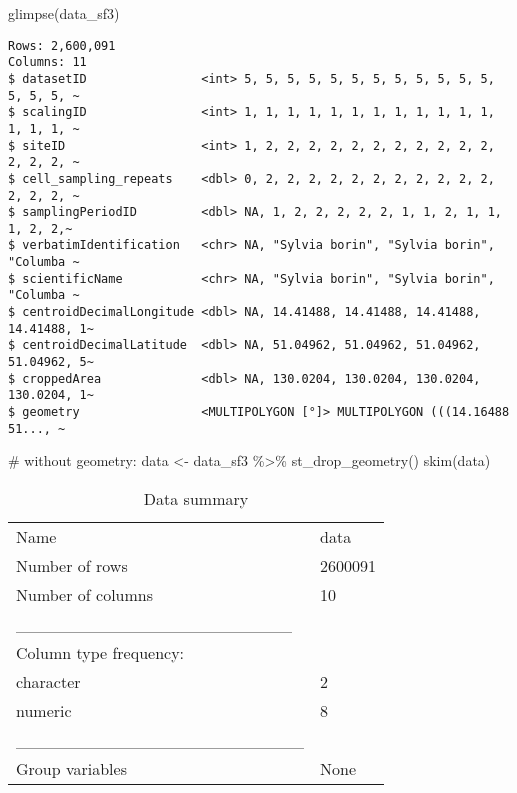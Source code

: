 \documentclass[
  letterpaper,
  DIV=11,
  numbers=noendperiod]{scrreprt}
\newenvironment{Shaded}{\begin{snugshade}}{\end{snugshade}}
\newcommand{\CommentTok}[1]{\textcolor[rgb]{0.37,0.37,0.37}{#1}}
\newcommand{\FunctionTok}[1]{\textcolor[rgb]{0.28,0.35,0.67}{#1}}
\newcommand{\NormalTok}[1]{\textcolor[rgb]{0.00,0.23,0.31}{#1}}
\newcommand{\OtherTok}[1]{\textcolor[rgb]{0.00,0.23,0.31}{#1}}
\newcommand{\SpecialCharTok}[1]{\textcolor[rgb]{0.37,0.37,0.37}{#1}}
\begin{document}
\begin{Shaded}
\begin{Highlighting}[]
\FunctionTok{glimpse}\NormalTok{(data\_sf3)}
\end{Highlighting}
\end{Shaded}

\begin{verbatim}
Rows: 2,600,091
Columns: 11
$ datasetID                <int> 5, 5, 5, 5, 5, 5, 5, 5, 5, 5, 5, 5, 5, 5, 5, ~
$ scalingID                <int> 1, 1, 1, 1, 1, 1, 1, 1, 1, 1, 1, 1, 1, 1, 1, ~
$ siteID                   <int> 1, 2, 2, 2, 2, 2, 2, 2, 2, 2, 2, 2, 2, 2, 2, ~
$ cell_sampling_repeats    <dbl> 0, 2, 2, 2, 2, 2, 2, 2, 2, 2, 2, 2, 2, 2, 2, ~
$ samplingPeriodID         <dbl> NA, 1, 2, 2, 2, 2, 2, 1, 1, 2, 1, 1, 1, 2, 2,~
$ verbatimIdentification   <chr> NA, "Sylvia borin", "Sylvia borin", "Columba ~
$ scientificName           <chr> NA, "Sylvia borin", "Sylvia borin", "Columba ~
$ centroidDecimalLongitude <dbl> NA, 14.41488, 14.41488, 14.41488, 14.41488, 1~
$ centroidDecimalLatitude  <dbl> NA, 51.04962, 51.04962, 51.04962, 51.04962, 5~
$ croppedArea              <dbl> NA, 130.0204, 130.0204, 130.0204, 130.0204, 1~
$ geometry                 <MULTIPOLYGON [°]> MULTIPOLYGON (((14.16488 51..., ~
\end{verbatim}

\begin{Shaded}
\begin{Highlighting}[]
\CommentTok{\# without geometry:}
\NormalTok{data }\OtherTok{\textless{}{-}}\NormalTok{ data\_sf3 }\SpecialCharTok{\%\textgreater{}\%}
  \FunctionTok{st\_drop\_geometry}\NormalTok{()}
\FunctionTok{skim}\NormalTok{(data)}
\end{Highlighting}
\end{Shaded}

\begin{longtable}[]{@{}ll@{}}
\caption{Data summary}\tabularnewline
\toprule\noalign{}
\endfirsthead
\endhead
\bottomrule\noalign{}
\endlastfoot
Name & data \\
Number of rows & 2600091 \\
Number of columns & 10 \\
\_\_\_\_\_\_\_\_\_\_\_\_\_\_\_\_\_\_\_\_\_\_\_ & \\
Column type frequency: & \\
character & 2 \\
numeric & 8 \\
\_\_\_\_\_\_\_\_\_\_\_\_\_\_\_\_\_\_\_\_\_\_\_\_ & \\
Group variables & None \\
\end{longtable}
\end{document}
